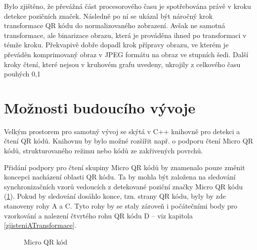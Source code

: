 Bylo zjištěno, že převážná část procesorového času je spotřebována právě v kroku
detekce pozičních značek. Následně po ní se ukázal být náročný krok transformace
QR kódu do normalizovaného zobrazení. Avšak ne samotná transformace, ale
binarizace obrazu, která je prováděna ihned po transformaci v témže kroku.
Překvapivě dobře dopadl krok přípravy obrazu, ve kterém je převáděn komprimovaný
obraz v JPEG formátu na obraz ve stupních šedi. Další kroky čtení, které nejsou
v kruhovém grafu uvedeny, ukrojily z celkového času pouhých 0,1%

\section{Možnosti budoucího vývoje}

Velkým prostorem pro samotný vývoj se skýtá v C++ knihovně pro detekci a čtení
QR kódů. Knihovnu by bylo možné rozšířit např. o podporu čtení Micro QR kódů,
strukturovaného režimu nebo kódů ze zakřivených povrchů.

Přidání podpory pro čtení skupiny Micro QR kódů by znamenalo pouze změnit
koncepci nacházení oblasti QR kódu. Ta by mohla být založena na sledování
synchronizačních vzorů vedoucích z detekované poziční značky Micro QR kódu
(\ref{microQRCodePoints}).
Pokud by sledování dosáhlo konce, tzn. strany QR kódu, byly by zde stanoveny
rohy A a C. Tyto rohy by se staly zároveň i počátečními body pro vzorkování a
nalezení čtvrtého rohu QR kódu D -- viz kapitola \ref{zjisteniATransformace}.

 \begin{figure}[H]
  \begin{center}
    \caption{Micro QR kód}
    \label{microQRCodePoints}
  \end{center}
\end{figure}

